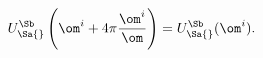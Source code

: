 \begin{equation*}
  U_\Sa{}^\Sb\left(\om^i+4\pi\frac{\om^i}\om\right)=U_\Sa{}^\Sb(\om^i).
\end{equation*}


